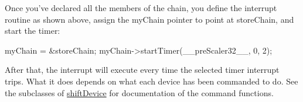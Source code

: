 Once you've declared all the members of the chain, you define the interrupt routine as shown above, assign the myChain pointer to point at storeChain, and start the timer:


\begin{DoxyCode}
  myChain = &storeChain; 
  myChain->startTimer(__preScaler32__, 0, 2);
\end{DoxyCode}


After that, the interrupt will execute every time the selected timer interrupt trips. What it does depends on what each device has been commanded to do. See the subclasses of \hyperlink{classshift_device}{shiftDevice} for documentation of the command functions. 